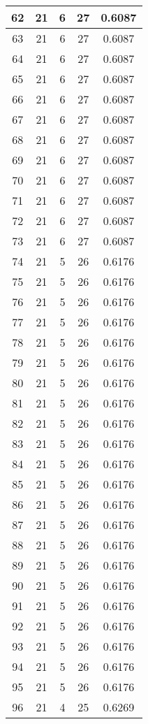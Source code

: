 \documentclass[letterpaper, 12pt]{article}
\begin{document}
\begin{longtable}{|c|c|c|c|c|}
\hline
62 & 21 & 6 & 27 & 0.6087 \\
\hline
63 & 21 & 6 & 27 & 0.6087 \\
\hline
64 & 21 & 6 & 27 & 0.6087 \\
\hline
65 & 21 & 6 & 27 & 0.6087 \\
\hline
66 & 21 & 6 & 27 & 0.6087 \\
\hline
67 & 21 & 6 & 27 & 0.6087 \\
\hline
68 & 21 & 6 & 27 & 0.6087 \\
\hline
69 & 21 & 6 & 27 & 0.6087 \\
\hline
70 & 21 & 6 & 27 & 0.6087 \\
\hline
71 & 21 & 6 & 27 & 0.6087 \\
\hline
72 & 21 & 6 & 27 & 0.6087 \\
\hline
73 & 21 & 6 & 27 & 0.6087 \\
\hline
74 & 21 & 5 & 26 & 0.6176 \\
\hline
75 & 21 & 5 & 26 & 0.6176 \\
\hline
76 & 21 & 5 & 26 & 0.6176 \\
\hline
77 & 21 & 5 & 26 & 0.6176 \\
\hline
78 & 21 & 5 & 26 & 0.6176 \\
\hline
79 & 21 & 5 & 26 & 0.6176 \\
\hline
80 & 21 & 5 & 26 & 0.6176 \\
\hline
81 & 21 & 5 & 26 & 0.6176 \\
\hline
82 & 21 & 5 & 26 & 0.6176 \\
\hline
83 & 21 & 5 & 26 & 0.6176 \\
\hline
84 & 21 & 5 & 26 & 0.6176 \\
\hline
85 & 21 & 5 & 26 & 0.6176 \\
\hline
86 & 21 & 5 & 26 & 0.6176 \\
\hline
87 & 21 & 5 & 26 & 0.6176 \\
\hline
88 & 21 & 5 & 26 & 0.6176 \\
\hline
89 & 21 & 5 & 26 & 0.6176 \\
\hline
90 & 21 & 5 & 26 & 0.6176 \\
\hline
91 & 21 & 5 & 26 & 0.6176 \\
\hline
92 & 21 & 5 & 26 & 0.6176 \\
\hline
93 & 21 & 5 & 26 & 0.6176 \\
\hline
94 & 21 & 5 & 26 & 0.6176 \\
\hline
95 & 21 & 5 & 26 & 0.6176 \\
\hline
96 & 21 & 4 & 25 & 0.6269 \\

\end{longtable}
\end{document}
